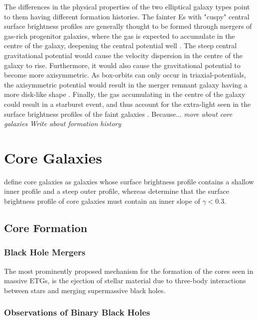 \documentclass[english, oneside]{HYgradu}
\begin{document}
The differences in the physical properties of the two elliptical galaxy types point to them having different formation histories. The fainter Es with "cuspy" central surface brightness profiles are generally thought to be formed through mergers of gas-rich progenitor galaxies, where the gas is expected to accumulate in the centre of the galaxy, deepening the central potential well \citep{Barnes1996}. The steep central gravitational potential would cause the velocity dispersion in the centre of the galaxy to rise. Furthermore, it would also cause the gravitational potential to become more axisymmetric. As box-orbits can only occur in triaxial-potentials, the axisymmetric potential would result in the merger remnant galaxy having a more disk-like shape \citep{Naab2006}. Finally, the gas accumulating in the centre of the galaxy could result in a starburst event, and thus account for the extra-light seen in the surface brightness profiles of the faint galaxies \citep{Naab2017}. Because... \textit{more about core galaxies}
\textit{Write about formation history}

\section{Core Galaxies}

\cite{Kormendy1999} define core galaxies as galaxies whose surface brightness profile contains a shallow inner profile and a steep outer profile, whereas \cite{Lauer1995} determine that the surface brightness profile of core galaxies must contain an inner slope of $\gamma < 0.3$. 

\subsection{Core Formation}

\subsubsection{Black Hole Mergers}

The most prominently proposed mechanism for the formation of the cores seen in massive ETGs, is the ejection of stellar material due to three-body interactions between stars and merging supermassive black holes.

\subsubsection{Observations of Binary Black Holes}
\end{document}
